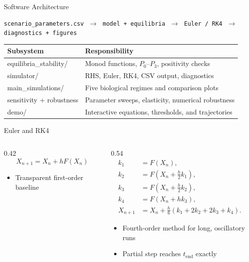 
\begin{frame}{Software Architecture}
  \begin{center}
    \fontsize{14}{18}\selectfont
    \texttt{scenario\_parameters.csv}
    $\;\longrightarrow\;$
    \texttt{model + equilibria}
    $\;\longrightarrow\;$
    \texttt{Euler / RK4}
    $\;\longrightarrow\;$
    \texttt{diagnostics + figures}
  \end{center}

  \vspace{0.35cm}
  {\fontsize{11}{14}\selectfont
  \renewcommand{\arraystretch}{1.12}
  \begin{tabular}{>{\ttfamily}p{}p{}}
    \toprule
    Subsystem & Responsibility \\
    \midrule
    equilibria\_stability/ & Monod functions, $P_0$--$P_3$, positivity checks \\
    simulator/ & RHS, Euler, RK4, CSV output, diagnostics \\
    main\_simulations/ & Five biological regimes and comparison plots \\
    sensitivity + robustness & Parameter sweeps, elasticity, numerical robustness \\
    demo/ & Interactive equations, thresholds, and trajectories \\
    \bottomrule
  \end{tabular}}
\end{frame}

\begin{frame}{Euler and RK4}
  \begin{columns}[T,onlytextwidth]
    \begin{column}{0.42\textwidth}
      \[
        X_{n+1}=X_n+hF(X_n)
      \]
      \begin{itemize}
        \item Transparent first-order baseline
      \end{itemize}
    \end{column}
    \begin{column}{0.54\textwidth}
      \begin{align*}
        k_1 &= F(X_n),\\
        k_2 &= F(X_n+\tfrac h2k_1),\\
        k_3 &= F(X_n+\tfrac h2k_2),\\
        k_4 &= F(X_n+hk_3),\\[-0.05cm]
        X_{n+1} &= X_n+\frac h6(k_1+2k_2+2k_3+k_4).
      \end{align*}
      \begin{itemize}
        \item Fourth-order method for long, oscillatory runs
        \item Partial step reaches $t_{\mathrm{end}}$ exactly
      \end{itemize}
    \end{column}
  \end{columns}
\end{frame}

